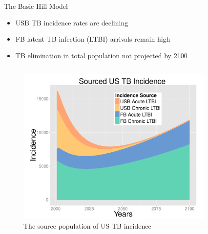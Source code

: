 \documentclass[final]{beamer}
\begin{document}
\begin{frame}
\begin{columns}[T]
\begin{column}{.3\textwidth}
\begin{block}{The Basic Hill Model}
        \vspace{1em}
        \begin{itemize}
          \item USB TB incidence rates are declining
          \item FB latent TB infection (LTBI) arrivals remain high
          \item TB elimination in total population not projected by 2100
        \end{itemize}
        \vspace{1em}
        \begin{columns}
          \begin{column}{.47\textwidth}
            \begin{figure}[h]
              \begin{center}
                \includegraphics[width=\textwidth] {incPlotSourced2}
              \end{center}
              \caption{The source population of US TB incidence}
              \label{fig:incPlotSourced}
            \end{figure}
          \end{column}
          \begin{column}{.47\textwidth}
            \begin{figure}[h]
              \begin{center}

\end{center}
\end{figure}
\end{column}
\end{columns}
\end{block}
\end{column}
\end{columns}
\end{frame}
\end{document}
